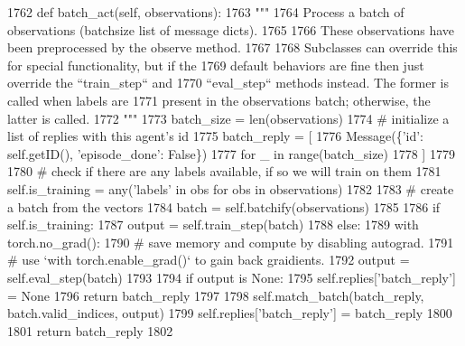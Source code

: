 \begin{DoxyCode}
1762     \textcolor{keyword}{def }batch\_act(self, observations):
1763         \textcolor{stringliteral}{"""}
1764 \textcolor{stringliteral}{        Process a batch of observations (batchsize list of message dicts).}
1765 \textcolor{stringliteral}{}
1766 \textcolor{stringliteral}{        These observations have been preprocessed by the observe method.}
1767 \textcolor{stringliteral}{}
1768 \textcolor{stringliteral}{        Subclasses can override this for special functionality, but if the}
1769 \textcolor{stringliteral}{        default behaviors are fine then just override the ``train\_step`` and}
1770 \textcolor{stringliteral}{        ``eval\_step`` methods instead. The former is called when labels are}
1771 \textcolor{stringliteral}{        present in the observations batch; otherwise, the latter is called.}
1772 \textcolor{stringliteral}{        """}
1773         batch\_size = len(observations)
1774         \textcolor{comment}{# initialize a list of replies with this agent's id}
1775         batch\_reply = [
1776             Message(\{\textcolor{stringliteral}{'id'}: self.getID(), \textcolor{stringliteral}{'episode\_done'}: \textcolor{keyword}{False}\})
1777             \textcolor{keywordflow}{for} \_ \textcolor{keywordflow}{in} range(batch\_size)
1778         ]
1779 
1780         \textcolor{comment}{# check if there are any labels available, if so we will train on them}
1781         self.is\_training = any(\textcolor{stringliteral}{'labels'} \textcolor{keywordflow}{in} obs \textcolor{keywordflow}{for} obs \textcolor{keywordflow}{in} observations)
1782 
1783         \textcolor{comment}{# create a batch from the vectors}
1784         batch = self.batchify(observations)
1785 
1786         \textcolor{keywordflow}{if} self.is\_training:
1787             output = self.train\_step(batch)
1788         \textcolor{keywordflow}{else}:
1789             with torch.no\_grad():
1790                 \textcolor{comment}{# save memory and compute by disabling autograd.}
1791                 \textcolor{comment}{# use `with torch.enable\_grad()` to gain back graidients.}
1792                 output = self.eval\_step(batch)
1793 
1794         \textcolor{keywordflow}{if} output \textcolor{keywordflow}{is} \textcolor{keywordtype}{None}:
1795             self.replies[\textcolor{stringliteral}{'batch\_reply'}] = \textcolor{keywordtype}{None}
1796             \textcolor{keywordflow}{return} batch\_reply
1797 
1798         self.match\_batch(batch\_reply, batch.valid\_indices, output)
1799         self.replies[\textcolor{stringliteral}{'batch\_reply'}] = batch\_reply
1800 
1801         \textcolor{keywordflow}{return} batch\_reply
1802 
\end{DoxyCode}
\mbox{\label{classparlai_1_1core_1_1torch__agent_1_1TorchAgent_a4c5824776df0c6cf995984a5e7a3f433}} 
